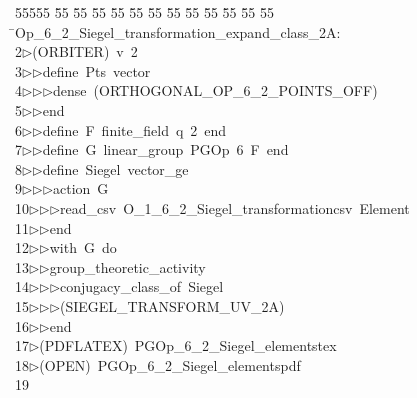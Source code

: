 %
%
\begin{tabbing}
55555 \= 55 \= 55 \= 55 \= 55 \= 55 \= 55 \= 55 \= 55 \= 55 \= 55 \= 55 \= 55 \= \>Op\_6\_2\_Siegel\_transformation\_expand\_class\_2A:\\[0pt]
2\>$\triangleright$\>(ORBITER)\ v\ 2\ \\[0pt]
3\>$\triangleright$\>$\triangleright$\>define\ Pts\ vector\ \\[0pt]
4\>$\triangleright$\>$\triangleright$\>$\triangleright$\>dense\ (ORTHOGONAL\_OP\_6\_2\_POINTS\_OFF)\ \\[0pt]
5\>$\triangleright$\>$\triangleright$\>end\ \\[0pt]
6\>$\triangleright$\>$\triangleright$\>define\ F\ finite\_field\ q\ 2\ end\ \\[0pt]
7\>$\triangleright$\>$\triangleright$\>define\ G\ linear\_group\ PGOp\ 6\ F\ end\ \\[0pt]
8\>$\triangleright$\>$\triangleright$\>define\ Siegel\ vector\_ge\ \\[0pt]
9\>$\triangleright$\>$\triangleright$\>$\triangleright$\>action\ G\ \\[0pt]
10\>$\triangleright$\>$\triangleright$\>$\triangleright$\>read\_csv\ O\_1\_6\_2\_Siegel\_transformationcsv\ Element\ \\[0pt]
11\>$\triangleright$\>$\triangleright$\>end\ \\[0pt]
12\>$\triangleright$\>$\triangleright$\>with\ G\ do\ \\[0pt]
13\>$\triangleright$\>$\triangleright$\>group\_theoretic\_activity\ \\[0pt]
14\>$\triangleright$\>$\triangleright$\>$\triangleright$\>conjugacy\_class\_of\ Siegel\ \\[0pt]
15\>$\triangleright$\>$\triangleright$\>$\triangleright$\>(SIEGEL\_TRANSFORM\_UV\_2A)\ \\[0pt]
16\>$\triangleright$\>$\triangleright$\>end\\[0pt]
17\>$\triangleright$\>(PDFLATEX)\ PGOp\_6\_2\_Siegel\_elementstex\\[0pt]
18\>$\triangleright$\>(OPEN)\ PGOp\_6\_2\_Siegel\_elementspdf\\[0pt]
19\>\end{tabbing}
